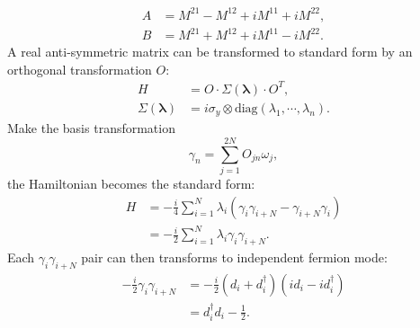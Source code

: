 \documentclass[aps,prb,superscriptaddress,nofootinbib]{revtex4}
\begin{document}
\begin{equation}
\begin{aligned}
	A &= M^{21} - M^{12} + i M^{11} + i M^{22}, \\
	B &= M^{21} + M^{12} + i M^{11} - i M^{22}.
	\label{eq:lattice-majorana-bilinear-to-fermion}
\end{aligned}
\end{equation}
A real anti-symmetric matrix can be transformed to standard form by an orthogonal transformation $O$:
\begin{equation}
\begin{aligned}
	H &= O \cdot \Sigma(\bm \lambda) \cdot O^T, \\
	\Sigma(\bm \lambda) &= i\sigma_y \otimes \mathrm{diag}(\lambda_1,\cdots,\lambda_n).
\end{aligned}
\end{equation}
Make the basis transformation
\begin{equation}
	\gamma_n = \sum_{j=1}^{2N} O_{jn} \omega_j,
\end{equation}
the Hamiltonian becomes the standard form:
\begin{equation}
\begin{aligned}
	H &= -\frac{i}{4} \sum_{i=1}^N \lambda_i (\gamma_i \gamma_{i+N}-\gamma_{i+N} \gamma_i) \\
	&= -\frac{i}{2} \sum_{i=1}^N \lambda_i \gamma_i \gamma_{i+N}.
\end{aligned}
\end{equation}
Each $\gamma_i \gamma_{i+N}$ pair can then transforms to independent fermion mode:
\begin{equation}
\begin{aligned}
	-\frac{i}{2}\gamma_i \gamma_{i+N} 
	&= -\frac{i}{2}(d_i + d_i^\dagger)(id_i-id_i^\dagger) \\ 
	&= d_i^\dagger d_i-\frac{1}{2}.
\end{aligned}
\end{equation}
\end{document}
